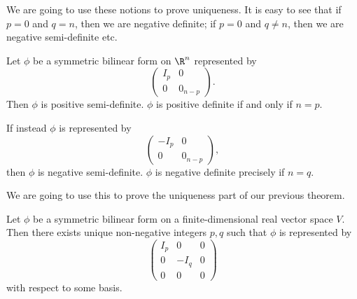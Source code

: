 \documentclass[a4paper]{article}
\begin{document}
We are going to use these notions to prove uniqueness. It is easy to see that if $p = 0$ and $q = n$, then we are negative definite; if $p = 0$ and $q \not= n$, then we are negative semi-definite etc.

\begin{eg}
  Let $\phi$ be a symmetric bilinear form on $\R^n$ represented by
  \[
    \begin{pmatrix}
      I_p & 0\\
      0 & 0_{n - p}
    \end{pmatrix}.
  \]
  Then $\phi$ is positive semi-definite. $\phi$ is positive definite if and only if $n = p$.

  If instead $\phi$ is represented by
  \[
    \begin{pmatrix}
      -I_p & 0\\
      0 & 0_{n - p}
    \end{pmatrix},
  \]
  then $\phi$ is negative semi-definite. $\phi$ is negative definite precisely if $n = q$.
\end{eg}

We are going to use this to prove the uniqueness part of our previous theorem.
\begin{thm}
  Let $\phi$ be a symmetric bilinear form on a finite-dimensional real vector space $V$. Then there exists unique non-negative integers $p, q$ such that $\phi$ is represented by
  \[
    \begin{pmatrix}
      I_p & 0 & 0\\
      0 & -I_q & 0\\
      0 & 0 & 0
    \end{pmatrix}
  \]
  with respect to some basis.
\end{thm}
\end{document}
